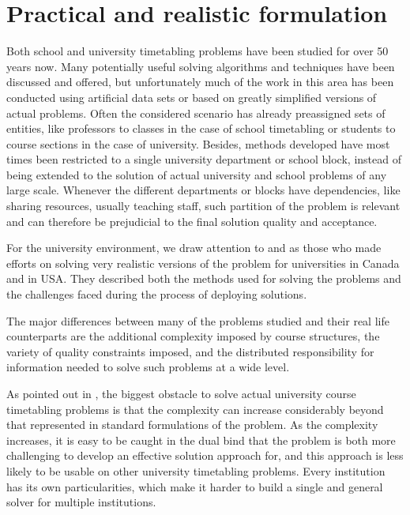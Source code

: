 \section{Practical and realistic formulation}

Both school and university timetabling problems have been studied for over 50 years now. Many potentially useful solving algorithms and techniques have been discussed and offered, but unfortunately much of the work in this area has been conducted using artificial data sets or based on greatly simplified versions of actual problems. Often the considered scenario has already preassigned sets of entities, like professors to classes in the case of school timetabling or students to course sections in the case of university. Besides, methods developed have most times been restricted to a single university department or school block, instead of being extended to the solution of actual university and school problems of any large scale. Whenever the different departments or blocks have dependencies, like sharing resources, usually teaching staff, such partition of the problem is relevant and can therefore be prejudicial to the final solution quality and acceptance.

For the university environment, we draw attention to \cite{Carter2001} and \cite{Murray2007} as those who made efforts on solving very realistic versions of the problem for universities in Canada and in USA. They described both the methods used for solving the problems and the challenges faced during the process of deploying solutions.

The major differences between many of the problems studied and their real life counterparts are the additional complexity imposed by course structures, the variety of quality constraints imposed, and the distributed responsibility for information needed to solve such problems at a wide level.

As pointed out in \cite{Murray2007}, the biggest obstacle to solve actual university course timetabling problems is that the complexity can increase considerably beyond that represented in standard formulations of the problem. As the complexity increases, it is easy to be caught in the dual bind that the problem is both more challenging to develop an effective solution approach for, and this approach is less likely to be usable on other university timetabling problems. Every institution has its own particularities, which make it harder to build a single and general solver for multiple institutions.

